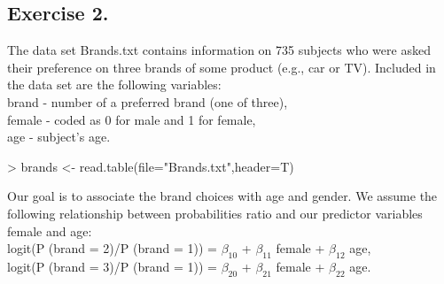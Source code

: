 \documentclass[a4paper]{article}
\begin{document}
\subsection{Exercise 2.} The data set Brands.txt contains information on 735
subjects who were asked their preference on three brands of some product (e.g.,
car or TV). Included in the data set are the following variables:\\
brand - number of a preferred brand (one of three),\\ 
female - coded as 0 for male and 1 for female,\\ 
age - subject's age.
\begin{Schunk}
\begin{Sinput}
> brands <- read.table(file="Brands.txt",header=T)	
\end{Sinput}
\end{Schunk}
Our goal is to associate the brand choices with age and gender. We assume the
following relationship between probabilities ratio and our predictor variables
female and age:\\
logit(P (brand = 2)/P (brand = 1)) = $\beta_{10}$ + $\beta_{11}$ female +
$\beta_{12}$ age, \\ 
logit(P (brand = 3)/P (brand = 1)) = $\beta_{20}$ + $\beta_{21}$ female +
$\beta_{22}$ age.
\end{document}
